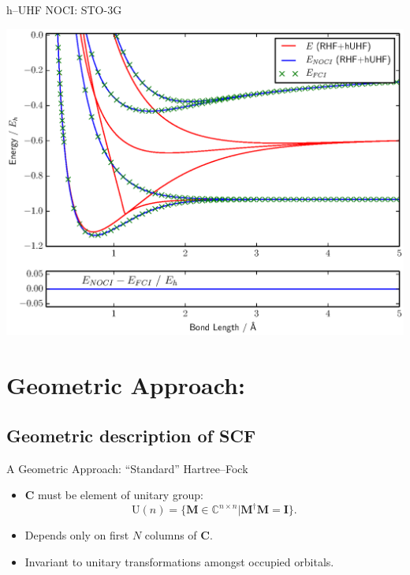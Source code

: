 \documentclass{beamer}
\begin{document}
\begin{frame}{h--UHF NOCI:  STO-3G}
 \vspace{-1em}
 \begin{center}
  \includegraphics[scale=0.4]{H2_STO-3G}
 \end{center}
\end{frame} 

\section{Geometric Approach:}
\subsection{Geometric description of SCF}
\begin{frame}{A Geometric Approach: ``Standard'' Hartree--Fock}
\begin{itemize}
  \item<1-> $\mathbf{C}$ must be element of unitary group:
  $$\mathrm{U} \left( n \right) = \{ \mathbf{M} \in \mathbb{C}^{n \times n} | \mathbf{M}^{\dagger} \mathbf{M} = \mathbf{I} \}.$$
\end{itemize}
\vspace{-1em}
\begin{itemize}
  \item<2-> Depends only on first $N$ columns of $\mathbf{C}.$
  \item<2-> Invariant to unitary transformations amongst occupied orbitals.
\end{itemize}
\end{frame}
\end{document}
